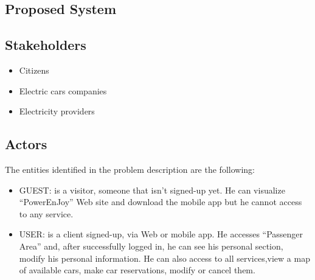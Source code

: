 \documentclass[english]{article}
\begin{document}
\subsection{Proposed System}


\subsection{Stakeholders}
\begin{itemize}
	\item Citizens
	\item Electric cars companies
	\item Electricity providers
	
	
\end{itemize}



\subsection{Actors}
The entities identified in the problem description are the following: 
\begin{itemize}
	\item GUEST: is a visitor, someone that isn't signed-up yet. He can visualize
	``PowerEnJoy'' Web site and download the mobile app but he cannot
	access to any service.
	\item USER: is a client signed-up, via Web or mobile app. He accesses
	``Passenger Area'' and, after successfully logged in, he can see
	his personal section, modify his personal information. He can also
	access to all services,view a map of available cars, make car reservations, modify or
	cancel them.
\end{itemize}
\end{document}
